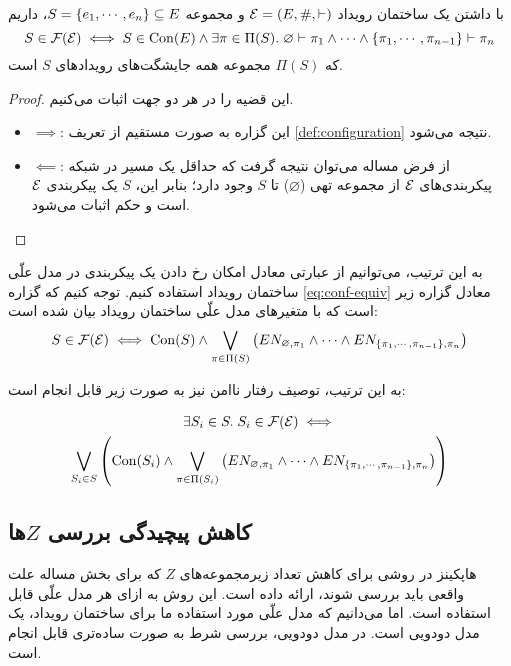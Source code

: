 \begin{theorem}\label{th:conf-equiv}
  با داشتن یک ساختمان رویداد
  $\mathcal{E}=(E,\#,\vdash)$
  و مجموعه
  $S = \left\{ e_1,\cdots,e_n \right\} \subseteq E$،
  داریم
  \begin{equation}\label{eq:conf-equiv}
    S \in \operatorname{\mathcal{F}}(\mathcal{E}) \iff
    S \in \operatorname{Con}(E)
    \wedge \exists \pi \in \Pi(S).\;
    \varnothing \vdash \pi_1 \wedge \cdots \wedge
    \left\{ \pi_1,\cdots,\pi_{n-1} \right\} \vdash \pi_n
  \end{equation}
  که
  $\Pi(S)$
  مجموعه همه جایشگت‌های رویدادهای
  $S$
  است.
\end{theorem}

\begin{proof}
  این قضیه را در هر دو جهت اثبات می‌کنیم.
  \begin{itemize}
    \item $\implies$:
    این گزاره به صورت مستقیم از تعریف
    \ref{def:configuration}
    نتیجه می‌شود.
    \item $\impliedby$:
    از فرض مساله می‌توان نتیجه گرفت که حداقل
    یک مسیر در شبکه پیکربندی‌های
    $\mathcal{E}$
    از مجموعه تهی
    ($\varnothing$)
    تا $S$
    وجود دارد؛ بنابر این،
    $S$
    یک پیکربندی
    $\mathcal{E}$
    است و حکم اثبات می‌شود.
  \end{itemize}
\end{proof}

به این ترتیب، می‌توانیم از عبارتی معادل
امکان رخ دادن یک پیکربندی در مدل علّی ساختمان رویداد
استفاده کنیم. توجه کنیم که گزاره
\ref{eq:conf-equiv}
معادل گزاره زیر است که با متغیرهای مدل علّی
ساختمان رویداد بیان شده است:
\begin{equation}\label{eq:conf-equiv-cm}
  S \in \operatorname{\mathcal{F}}(\mathcal{E}) \iff
  \operatorname{Con}(S) \wedge
  \bigvee_{\pi \in \Pi(S)} \left(
    EN_{\varnothing, \pi_1} \wedge \cdots \wedge
    EN_{\left\{ \pi_1,\cdots,\pi_{n-1} \right\}, \pi_n}
  \right)
\end{equation}

به این ترتیب، توصیف رفتار ناامن نیز به صورت زیر قابل انجام است:

\begin{multline}\label{eq:unsafe-behavior-equiv-cm}
  \exists S_i \in S.\;S_i \in \operatorname{\mathcal{F}}(\mathcal{E}) \iff \\
  \bigvee_{S_i \in S} \left(
    \operatorname{Con}(S_i) \wedge
    \bigvee_{\pi \in \Pi(S_i)} \left(
      EN_{\varnothing, \pi_1} \wedge \cdots \wedge
      EN_{\left\{ \pi_1,\cdots,\pi_{n-1} \right\}, \pi_n}
    \right)
  \right)
\end{multline}

\subsection{کاهش پیچیدگی بررسی $Z$ها}
هاپکینز در
\cite{hopkins2002strategies}
روشی برای کاهش تعداد زیرمجموعه‌های
$Z$
که برای بخش
مساله علت واقعی باید بررسی شوند، ارائه داده است.
این روش به ازای هر مدل علّی قابل استفاده است.
اما می‌دانیم که مدل علّی مورد استفاده ما برای ساختمان رویداد،
یک مدل دودویی
است. در مدل دودویی، بررسی شرط
به صورت ساده‌تری قابل انجام است.

